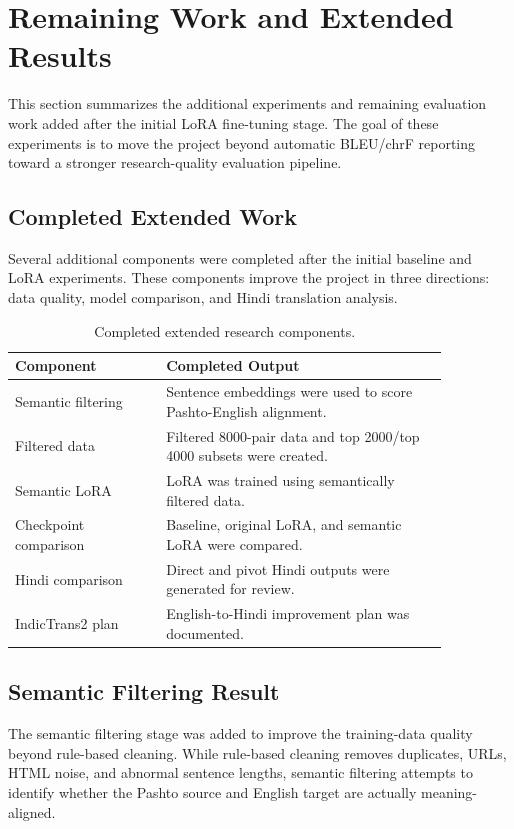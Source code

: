\documentclass[conference]{IEEEtran}
\begin{document}
\section{Remaining Work and Extended Results}

This section summarizes the additional experiments and remaining evaluation work added after the initial LoRA fine-tuning stage. The goal of these experiments is to move the project beyond automatic BLEU/chrF reporting toward a stronger research-quality evaluation pipeline.

\subsection{Completed Extended Work}

Several additional components were completed after the initial baseline and LoRA experiments. These components improve the project in three directions: data quality, model comparison, and Hindi translation analysis.

\begin{table}[H]
\centering
\caption{Completed extended research components.}
\footnotesize
\begin{tabular}{p{0.30\linewidth}p{0.56\linewidth}}
\toprule
\textbf{Component} & \textbf{Completed Output} \\
\midrule
Semantic filtering & Sentence embeddings were used to score Pashto-English alignment. \\
Filtered data & Filtered 8000-pair data and top 2000/top 4000 subsets were created. \\
Semantic LoRA & LoRA was trained using semantically filtered data. \\
Checkpoint comparison & Baseline, original LoRA, and semantic LoRA were compared. \\
Hindi comparison & Direct and pivot Hindi outputs were generated for review. \\
IndicTrans2 plan & English-to-Hindi improvement plan was documented. \\
\bottomrule
\end{tabular}
\end{table}

\subsection{Semantic Filtering Result}

The semantic filtering stage was added to improve the training-data quality beyond rule-based cleaning. While rule-based cleaning removes duplicates, URLs, HTML noise, and abnormal sentence lengths, semantic filtering attempts to identify whether the Pashto source and English target are actually meaning-aligned.
\end{document}
